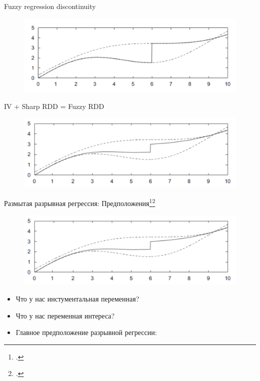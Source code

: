 \begin{frame}{Fuzzy regression discontinuity}
\begin{figure}
    \centering
    \includegraphics[width=\textwidth]{Images/sharp.png}
    \label{Sharp RDD}
\end{figure}
IV + Sharp RDD = Fuzzy RDD

\begin{figure}
    \centering
    \includegraphics[width=\textwidth]{Images/fuzzy.png}
    \label{Fuzzy RDD}
\end{figure}
\end{frame}


\begin{frame}{Размытая разрывная регрессия: Предположения\footcitetext[Глава 6]{angrist2008mostly}\footcitetext[Картинка из ][]{imbens2008regression}}
    \begin{figure}
    \centering
    \includegraphics[width=\textwidth]{Images/fuzzy.png}
    \label{Fuzzy RDD}
\end{figure}
    \begin{itemize}
    \item Что у нас инстументальная переменная? 
    \item Что у нас переменная интереса? 
    \item Главное предположение разрывной регрессии: 
    \end{itemize}
\end{frame}
